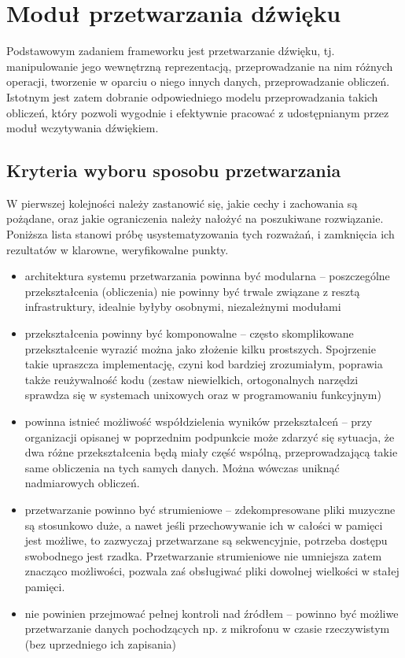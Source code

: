 
\section{Moduł przetwarzania dźwięku}

Podstawowym zadaniem frameworku jest przetwarzanie dźwięku, tj. manipulowanie jego wewnętrzną
reprezentacją, przeprowadzanie na nim różnych operacji, tworzenie w oparciu o niego innych danych,
przeprowadzanie obliczeń. Istotnym jest zatem dobranie odpowiedniego modelu przeprowadzania takich
obliczeń, który pozwoli wygodnie i efektywnie pracować z udostępnianym przez moduł wczytywania
dźwiękiem.


\subsection{Kryteria wyboru sposobu przetwarzania}

W pierwszej kolejności należy zastanowić się, jakie cechy i zachowania są pożądane, oraz jakie
ograniczenia należy nałożyć na poszukiwane rozwiązanie. Poniższa lista stanowi próbę
usystematyzowania tych rozważań, i zamknięcia ich rezultatów w klarowne, weryfikowalne punkty.

\begin{itemize}

  \item architektura systemu przetwarzania powinna być modularna -- poszczególne przekształcenia
    (obliczenia) nie powinny być trwale związane z resztą infrastruktury, idealnie byłyby osobnymi,
    niezależnymi modułami

  \item przekształcenia powinny być komponowalne -- często skomplikowane przekształcenie wyrazić
    można jako złożenie kilku prostszych. Spojrzenie takie upraszcza implementację, czyni kod
    bardziej zrozumiałym, poprawia także reużywalność kodu (zestaw niewielkich, ortogonalnych
    narzędzi sprawdza się w systemach unixowych oraz w programowaniu funkcyjnym)

  \item powinna istnieć możliwość współdzielenia wyników przekształceń -- przy organizacji opisanej
    w poprzednim podpunkcie może zdarzyć się sytuacja, że dwa różne przekształcenia będą miały część
    wspólną, przeprowadzającą takie same obliczenia na tych samych danych. Można wówczas uniknąć
    nadmiarowych obliczeń.

  \item przetwarzanie powinno być strumieniowe -- zdekompresowane pliki muzyczne są stosunkowo duże,
    a nawet jeśli przechowywanie ich w całości w pamięci jest możliwe, to zazwyczaj przetwarzane są
    sekwencyjnie, potrzeba dostępu swobodnego jest rzadka. Przetwarzanie strumieniowe nie umniejsza
    zatem znacząco możliwości, pozwala zaś obsługiwać pliki dowolnej wielkości w stałej pamięci.

  \item nie powinien przejmować pełnej kontroli nad źródłem -- powinno być możliwe przetwarzanie
    danych pochodzących np. z mikrofonu w czasie rzeczywistym (bez uprzedniego ich zapisania)

\end{itemize}


